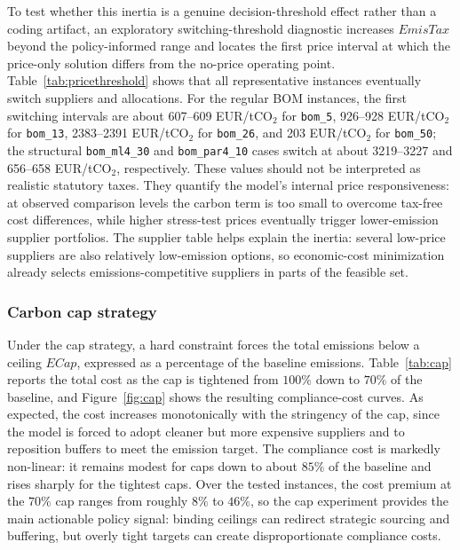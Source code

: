 \documentclass[preprint,12pt,authoryear]{elsarticle}
\begin{document}


To test whether this inertia is a genuine decision-threshold effect rather than a coding artifact, an exploratory switching-threshold diagnostic increases $EmisTax$ beyond the policy-informed range and locates the first price interval at which the price-only solution differs from the no-price operating point. Table~\ref{tab:pricethreshold} shows that all representative instances eventually switch suppliers and allocations. For the regular BOM instances, the first switching intervals are about 607--609 EUR/tCO$_2$ for \texttt{bom\_5}, 926--928 EUR/tCO$_2$ for \texttt{bom\_13}, 2383--2391 EUR/tCO$_2$ for \texttt{bom\_26}, and 203 EUR/tCO$_2$ for \texttt{bom\_50}; the structural \texttt{bom\_ml4\_30} and \texttt{bom\_par4\_10} cases switch at about 3219--3227 and 656--658 EUR/tCO$_2$, respectively. These values should not be interpreted as realistic statutory taxes. They quantify the model's internal price responsiveness: at observed comparison levels the carbon term is too small to overcome tax-free cost differences, while higher stress-test prices eventually trigger lower-emission supplier portfolios. The supplier table helps explain the inertia: several low-price suppliers are also relatively low-emission options, so economic-cost minimization already selects emissions-competitive suppliers in parts of the feasible set.



\subsubsection{Carbon cap strategy}
Under the cap strategy, a hard constraint forces the total emissions below a ceiling $ECap$, expressed as a percentage of the baseline emissions. Table~\ref{tab:cap} reports the total cost as the cap is tightened from $100\%$ down to $70\%$ of the baseline, and Figure~\ref{fig:cap} shows the resulting compliance-cost curves. As expected, the cost increases monotonically with the stringency of the cap, since the model is forced to adopt cleaner but more expensive suppliers and to reposition buffers to meet the emission target. The compliance cost is markedly non-linear: it remains modest for caps down to about $85\%$ of the baseline and rises sharply for the tightest caps. Over the tested instances, the cost premium at the $70\%$ cap ranges from roughly $8\%$ to $46\%$, so the cap experiment provides the main actionable policy signal: binding ceilings can redirect strategic sourcing and buffering, but overly tight targets can create disproportionate compliance costs.
\end{document}
